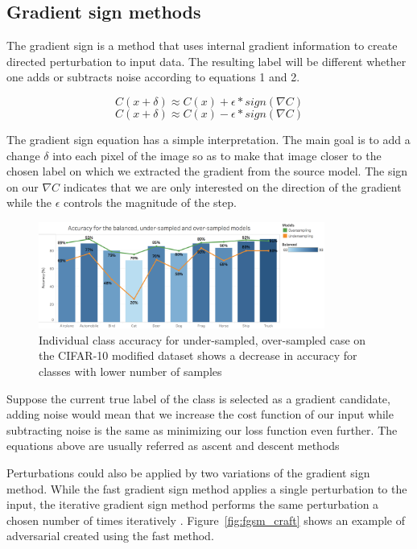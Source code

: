 \documentclass[runningheads,a4paper]{llncs}
\begin{document}
\subsection{Gradient sign methods}

The gradient sign is a method that uses internal gradient information to create directed perturbation to input data. The resulting label will be different whether one adds or subtracts noise according to equations 1 and 2. 

\begin{equation}
C(x + \delta)\approx C(x) + \epsilon * sign(\nabla C)
\end{equation}
\begin{equation}
C(x + \delta)\approx C(x) - \epsilon * sign(\nabla C)
\end{equation}

The gradient sign equation has a simple interpretation. The main goal is to add a change $\delta$ into each pixel of the image so as to make that image closer to the chosen label on which we extracted the gradient from the source model. The sign on our $\nabla C$ indicates that we are only interested on the direction of the gradient while the $\epsilon$ controls the magnitude of the step.

\begin{figure}
	\centering
	\includegraphics[height=3.5cm]{graph_non_pert.png}
	\caption{Individual class accuracy for under-sampled, over-sampled case on the CIFAR-10 modified dataset shows a decrease in accuracy for classes with lower number of samples}
	\label{fig:acc_graph}
\end{figure}

Suppose the current true label of the class is selected as a gradient candidate, adding noise would mean that we increase the cost function of our input while subtracting noise is the same as minimizing our loss function even further. 
The equations above are usually referred as ascent and descent methods

Perturbations could also be applied by two variations of the gradient sign method. While the fast gradient sign method applies a single perturbation to the input, the iterative gradient sign method performs the same perturbation a chosen number of times iteratively \cite{goodfellow2014}. Figure~\ref{fig:fgsm_craft} shows an example of adversarial created using the fast method.
\end{document}
